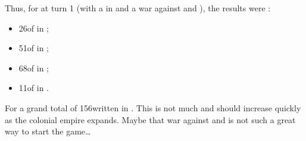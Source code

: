 \begin{exemple}
  Thus, for \POR at turn 1 (with a \REVOLT in \provinceBeira and a war
  against \paysMaroc and \TUR), the results were :
  \begin{itemize}
  \item 26\ducats of  in  ;
  \item 51\ducats of  in
     ;
  \item 68\ducats of  in  ;
  \item 11\ducats of  in .
  \end{itemize}
  For a grand total of 156\ducats written in . This is not much and should increase quickly as the colonial
  empire expands. Maybe that war against \paysMaroc and \TUR is not such
  a great way to start the game\ldots
\end{exemple}



